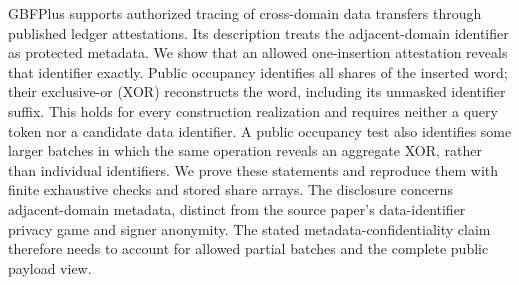 GBFPlus supports authorized tracing of cross-domain data transfers through
published ledger attestations. Its description treats the adjacent-domain
identifier as protected metadata. We show that an allowed one-insertion
attestation reveals that identifier exactly. Public occupancy identifies all
shares of the inserted word; their exclusive-or (XOR) reconstructs the word,
including its unmasked identifier suffix. This holds for every construction
realization and requires neither a query token nor a candidate data identifier.
A public occupancy test also identifies some larger batches in which the same
operation reveals an aggregate XOR, rather than individual identifiers.
We prove these statements and reproduce them with finite exhaustive checks and
stored share arrays. The disclosure concerns adjacent-domain metadata, distinct
from the source paper's data-identifier privacy game and signer anonymity.
The stated metadata-confidentiality claim therefore needs to account for allowed
partial batches and the complete public payload view.
